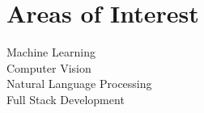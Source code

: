 \section{Areas of Interest}
Machine Learning \\
Computer Vision \\
Natural Language Processing \\
Full Stack Development
\sectionsep